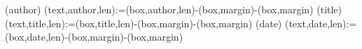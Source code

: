(author){%
  \spine(text,author,len):={\dimexpr\thespine(box,author,len)-\thespine(box,margin)-\thespine(box,margin)}
}{}
(title){%
  \spine(text,title,len):={\dimexpr\thespine(box,title,len)-\thespine(box,margin)-\thespine(box,margin)}
}{}
(date){%
  \spine(text,date,len):={\dimexpr\thespine(box,date,len)-\thespine(box,margin)-\thespine(box,margin)}
}{}


\newcommand{\@spinetextalin}[1]{%
  \raggedright%
  \IfStrEqCase{\thespine(box,#1,align)}{%
    {l}{\raggedright}%
    {c}{\centering}%
    {r}{\raggedleft}%
  }%
}

\newcommand{\@spinetextcolor}[1]{%
  \ifdatadefined{spine}(box,#1,textcolor){%
    \color{\thespine(box,#1,textcolor)}%
  }{\ifdatadefined{spine}(text,color){%
    \color{\thespine(text,color)}%
  }{}%
  }%
}

